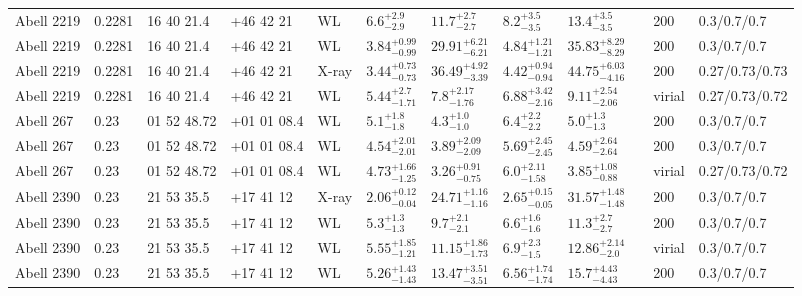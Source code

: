 \begin{landscape}
\begin{center}
{\begin{longtable}{llllllllllll}
Abell 2219 & 0.2281 & 16 40 21.4 & +46 42 21 & WL & ${6.6}^{+2.9}_{-2.9}$ & ${11.7}^{+2.7}_{-2.7}$ & ${8.2}^{+3.5}_{-3.5}$ & ${13.4}^{+3.5}_{-3.5}$ & \citet{SE14.1} & 200 & 0.3/0.7/0.7 \\
Abell 2219 & 0.2281 & 16 40 21.4 & +46 42 21 & WL & ${3.84}^{+0.99}_{-0.99}$ & ${29.91}^{+6.21}_{-6.21}$ & ${4.84}^{+1.21}_{-1.21}$ & ${35.83}^{+8.29}_{-8.29}$ & \citet{BA07.1} & 200 & 0.3/0.7/0.7 \\
Abell 2219 & 0.2281 & 16 40 21.4 & +46 42 21 & X-ray & ${3.44}^{+0.73}_{-0.73}$ & ${36.49}^{+4.92}_{-3.39}$ & ${4.42}^{+0.94}_{-0.94}$ & ${44.75}^{+6.03}_{-4.16}$ & \citet{BA14.1} & 200 & 0.27/0.73/0.73 \\
Abell 2219 & 0.2281 & 16 40 21.4 & +46 42 21 & WL & ${5.44}^{+2.7}_{-1.71}$ & ${7.8}^{+2.17}_{-1.76}$ & ${6.88}^{+3.42}_{-2.16}$ & ${9.11}^{+2.54}_{-2.06}$ & \citet{OK10.1} & virial & 0.27/0.73/0.72 \\
Abell 267 & 0.23 & 01 52 48.72 & +01 01 08.4 & WL & ${5.1}^{+1.8}_{-1.8}$ & ${4.3}^{+1.0}_{-1.0}$ & ${6.4}^{+2.2}_{-2.2}$ & ${5.0}^{+1.3}_{-1.3}$ & \citet{SE14.1} & 200 & 0.3/0.7/0.7 \\
Abell 267 & 0.23 & 01 52 48.72 & +01 01 08.4 & WL & ${4.54}^{+2.01}_{-2.01}$ & ${3.89}^{+2.09}_{-2.09}$ & ${5.69}^{+2.45}_{-2.45}$ & ${4.59}^{+2.64}_{-2.64}$ & \citet{BA07.1} & 200 & 0.3/0.7/0.7 \\
Abell 267 & 0.23 & 01 52 48.72 & +01 01 08.4 & WL & ${4.73}^{+1.66}_{-1.25}$ & ${3.26}^{+0.91}_{-0.75}$ & ${6.0}^{+2.11}_{-1.58}$ & ${3.85}^{+1.08}_{-0.88}$ & \citet{OK10.1} & virial & 0.27/0.73/0.72 \\
Abell 2390 & 0.23 & 21 53 35.5 & +17 41 12 & X-ray & ${2.06}^{+0.12}_{-0.04}$ & ${24.71}^{+1.16}_{-1.16}$ & ${2.65}^{+0.15}_{-0.05}$ & ${31.57}^{+1.48}_{-1.48}$ & \citet{ET11.1} & 200 & 0.3/0.7/0.7 \\
Abell 2390 & 0.23 & 21 53 35.5 & +17 41 12 & WL & ${5.3}^{+1.3}_{-1.3}$ & ${9.7}^{+2.1}_{-2.1}$ & ${6.6}^{+1.6}_{-1.6}$ & ${11.3}^{+2.7}_{-2.7}$ & \citet{SE14.1} & 200 & 0.3/0.7/0.7 \\
Abell 2390 & 0.23 & 21 53 35.5 & +17 41 12 & WL & ${5.55}^{+1.85}_{-1.21}$ & ${11.15}^{+1.86}_{-1.73}$ & ${6.9}^{+2.3}_{-1.5}$ & ${12.86}^{+2.14}_{-2.0}$ & \citet{UM09.1} & virial & 0.3/0.7/0.7 \\
Abell 2390 & 0.23 & 21 53 35.5 & +17 41 12 & WL & ${5.26}^{+1.43}_{-1.43}$ & ${13.47}^{+3.51}_{-3.51}$ & ${6.56}^{+1.74}_{-1.74}$ & ${15.7}^{+4.43}_{-4.43}$ & \citet{BA07.1} & 200 & 0.3/0.7/0.7 \\

\end{longtable}}
\end{center}
\end{landscape}
